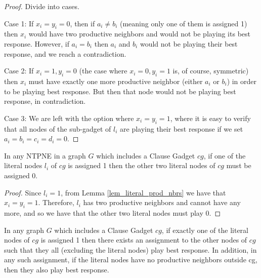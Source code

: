 \documentclass[runningheads]{llncs}
\begin{document}
\begin{proof}
Divide into cases.

Case 1: If $x_i=y_i=0$, then if $a_i\ne b_i$ (meaning only one of them is assigned 1) then $x_i$ would have two productive neighbors and would not be playing its best response. However, if $a_i=b_i$ then $a_i$ and $b_i$ would not be playing their best response, and we reach a contradiction.

Case 2: If $x_i=1,y_i=0$ (the case where $x_i=0,y_i=1$ is, of course, symmetric) then $x_i$ must have exactly one more productive neighbor (either $a_i$ or $b_i$) in order to be playing best response. But then that node would not be playing best response, in contradiction.

Case 3: We are left with the option where $x_i=y_i=1$, where it is easy to verify that all nodes of the sub-gadget of $l_i$ are playing their best response if we set $a_i=b_i=c_i=d_i=0$.
\end{proof}

\begin{lemma}
\label{lem_one_literal_on}
In any NTPNE in a graph $G$ which includes a Clause Gadget $cg$, if one of the literal nodes $l_i$ of $cg$ is assigned 1 then the other two literal nodes of $cg$ must be assigned 0.
\end{lemma}

\begin{proof}
Since $l_i=1$, from Lemma \ref{lem_literal_prod_nbrs} we have that $x_i=y_i=1$. Therefore, $l_i$ has two productive neighbors and cannot have any more, and so we have that the other two literal nodes must play 0.
\end{proof}

\begin{lemma}
\label{lem_cg_pne}
In any graph $G$ which includes a Clause Gadget $cg$, if exactly one of the literal nodes of $cg$ is assigned 1 then there exists an assignment to the other nodes of $cg$ such that they all (excluding the literal nodes) play best response. In addition, in any such assignment, if the literal nodes have no productive neighbors outside cg, then they also play best response.
\end{lemma}
\end{document}
